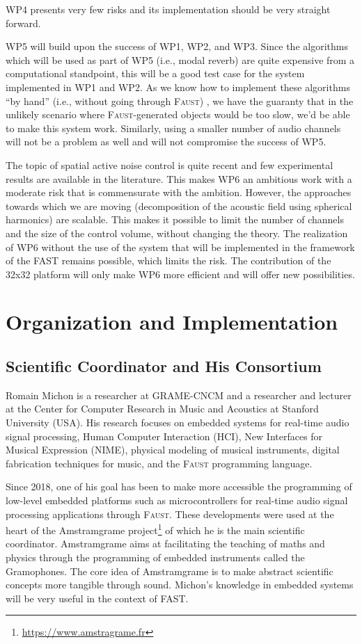 \documentclass[a4paper,9pt]{extarticle}
\newcommand{\F}{\textsc{Faust}}
\newcommand{\PP}{FAST}
\begin{document}
WP4 presents very few risks and its implementation should be very straight forward.

WP5 will build upon the success of WP1, WP2, and WP3. Since the algorithms which will be used as part of WP5 (i.e., modal reverb) are quite expensive from a computational standpoint, this will be a good test case for the system implemented in WP1 and WP2. As we know how to implement these algorithms ``by hand'' (i.e., without going through \F{}) \cite{volkova:hal-01561052}, we have the guaranty that in the unlikely scenario where \F{}-generated objects would be too slow, we'd be able to make this system work. Similarly, using a smaller number of audio channels will not be a problem as well and will not compromise the success of WP5.


The topic of spatial active noise control is quite recent and few experimental results are available in the literature. This makes WP6 an ambitious work with a moderate risk that is commensurate with the ambition. However, the approaches towards which we are moving (decomposition of the acoustic field using spherical harmonics) are scalable. This makes it possible to limit the number of channels and the size of the control volume, without changing the theory. The realization of WP6 without the use of the system that will be implemented in the framework of the \PP{} remains possible, which limits the risk. The contribution of the 32x32 platform will only make WP6 more efficient and will offer new possibilities.

\section{Organization and Implementation}

\subsection{Scientific Coordinator and His Consortium}
\label{subsec:consortium}

Romain Michon is a researcher at GRAME-CNCM and a researcher and lecturer at the Center for Computer Research in Music and Acoustics at Stanford University (USA). His research focuses on embedded systems for real-time audio signal processing, Human Computer Interaction (HCI), New Interfaces for Musical Expression (NIME), physical modeling of musical instruments, digital fabrication techniques for music, and the \F{} programming language. 

Since 2018, one of his goal has been to make more accessible the programming of low-level embedded platforms such as microcontrollers \cite{Michon2019,Michon2020} for real-time audio signal processing applications through \F{}. These developments were used at the heart of the Amstramgrame project\footnote{\url{https://www.amstragrame.fr}} of which he is the main scientific coordinator. Amstramgrame aims at facilitating the teaching of maths and physics through the programming of embedded instruments called the Gramophones. The core idea of Amstramgrame is to make abstract scientific concepts more tangible through sound. Michon's knowledge in embedded systems will be very useful in the context of \PP{}. 
\end{document}
